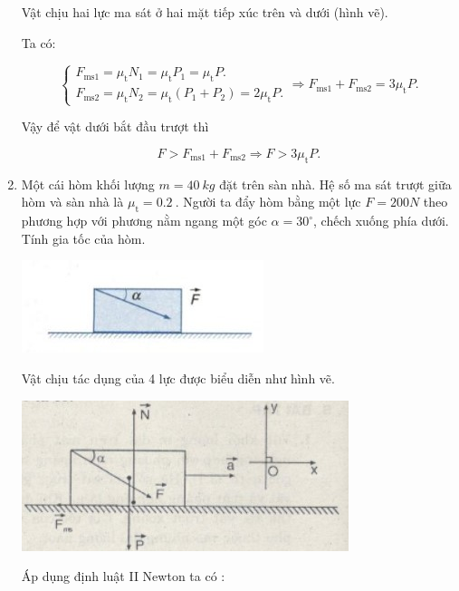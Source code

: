 \begin{enumerate}[label=\bfseries Câu \arabic*:]
{		Vật chịu hai lực ma sát ở hai mặt tiếp xúc trên và dưới (hình vẽ).
		
		Ta có:
		
		$$\begin{cases}
			F_\text{ms1} = \mu_\text{t}N_1 =  \mu_\text{t}P_1 = \mu_\text{t}P.\\
			F_\text{ms2} = \mu_\text{t}N_2 =  \mu_\text{t}(P_1 + P_2) = 2\mu_\text{t}P.
		\end{cases} \Rightarrow F_\text{ms1} + F_\text{ms2} = 3\mu_\text{t} P.$$
	
	Vậy để vật dưới bắt đầu trượt thì
	
	$$F > F_\text{ms1} + F_\text{ms2} \Rightarrow F > 3\mu_\text{t} P.$$
		
	
	}
	
	\item {}
	
	
	{
		Một cái hòm khối lượng $m = \SI{40}{kg}$ đặt trên sàn nhà. Hệ số ma sát trượt giữa hòm và sàn nhà là $\mu_\text{t} = \SI{0,2}{}$. Người ta đẩy hòm bằng một lực $F =200N$ theo phương hợp với phương nằm ngang một góc $\alpha = 30^\circ$, chếch xuống phía dưới. Tính gia tốc của hòm. 
		
		\begin{center}
			\includegraphics[scale=1]{../figs/VN10-2022-PH-TP021-17.jpg}
		\end{center}
	}
	
	\hideall
	{
		Vật chịu tác dụng của 4 lực được biểu diễn như hình vẽ.
		
		\begin{center}
			\includegraphics[scale=1]{../figs/VN10-2022-PH-TP021-18.jpg}
		\end{center}
	
		Áp dụng định luật II Newton ta có :
		
}
\end{enumerate}
